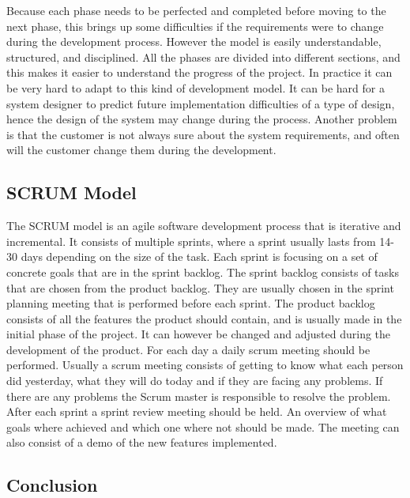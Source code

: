 Because each phase needs to be perfected and completed before moving to the next phase, this brings up some difficulties if the requirements were to change during the development process. 
However the model is easily understandable, structured, and disciplined. 
All the phases are divided into different sections, and this makes it easier to understand the progress of the project.
In practice it can be very hard to adapt to this kind of development model. 
It can be hard for a system designer to predict future implementation difficulties of a type of design, hence the design of the system may change during the process.
Another problem is that the customer is not always sure about the system requirements, and often will the customer change them during the development.

\subsection{SCRUM Model}

The SCRUM model is an agile software development process that is iterative and incremental.
It consists of multiple sprints, where a sprint usually lasts from 14-30 days depending on the size of the task.
Each sprint is focusing on a set of concrete goals that are in the sprint backlog.
The sprint backlog consists of tasks that are chosen from the product backlog. 
They are usually chosen in the sprint planning meeting that is performed before each sprint.
The product backlog consists of all the features the product should contain, and is usually made in the initial phase of the project.
It can however be changed and adjusted during the development of the product.
For each day a daily scrum meeting should be performed. 
Usually a scrum meeting consists of getting to know what each person did yesterday, what they will do today and if they are facing any problems.
If there are any problems the Scrum master is responsible to resolve the problem.
After each sprint a sprint review meeting should be held.
An overview of what goals where achieved and which one where not should be made.
The meeting can also consist of a demo of the new features implemented.

\subsection{Conclusion}

